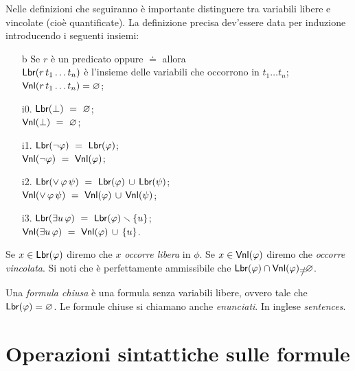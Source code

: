 \def\Vin{{\sf\small Vnl}}
\def\Lib{{\small \sf Lbr}}
Nelle definizioni che seguiranno \`e importante distinguere tra variabili libere e vincolate (cio\`e quantificate). La definizione precisa dev'essere data per induzione introducendo i seguenti insiemi:
\begin{itemize}
\item[b] Se $r$ \`e un predicato oppure $\doteq$ allora\\
         $\Lib(r\,t_1\dots t_n)$ \`e l'insieme delle variabili che occorrono in  $t_1\dots t_n$;\\
         $\Vin(r\,t_1\dots t_n)=\0$;
\end{itemize}
\begin{minipage}[t]{.499\textwidth}
\begin{itemize}       
\item[i0.] $\Lib(\bot)\ =\ \0$;\\
           $\Vin(\bot)\ =\ \0$;
\item[i1.] $\Lib(\neg\phi)\ =\ \Lib(\phi)$;\\
           $\Vin(\neg\phi)\ =\ \Vin(\phi)$;
\end{itemize}
\end{minipage}
\begin{minipage}[t]{.499\textwidth}
\begin{itemize}
\item[i2.] $\Lib(\vee\,\phi\,\psi)\ =\ \Lib(\phi)\,\cup\,\Lib(\psi)$;\\
           $\Vin(\vee\,\phi\,\psi)\ =\ \Vin(\phi)\,\cup\,\Vin(\psi)$;
\item[i3.] $\Lib(\E u\,\phi)\ =\ \Lib(\phi)\sm\{u\}$;\\
           $\Vin(\E u\,\phi)\ =\ \Vin(\phi)\,\cup\,\{u\}$.
\end{itemize}
\end{minipage}

Se $x\in\Lib(\phi)$ diremo che $x$ \emph{occorre libera} in $\phi$. Se $x\in\Vin(\phi)$ diremo che \emph{occorre vincolata}. Si noti che \`e perfettamente ammissibile che $\Lib(\phi)\cap\Vin(\phi)\neq\0$.

Una \emph{formula chiusa\/} \`e una formula senza variabili libere, ovvero tale che $\Lib(\phi)=\0$. Le formule chiuse si chiamano anche \emph{enunciati}. In inglese \emph{sentences}.


\section{Operazioni sintattiche sulle formule}

